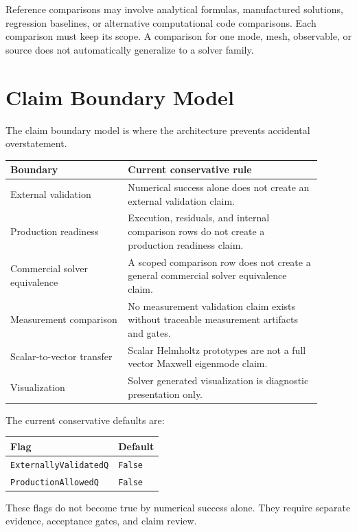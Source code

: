 \documentclass[11pt,a4paper]{article}
\newcommand{\code}[1]{\texttt{#1}}
\begin{document}
Reference comparisons may involve analytical formulas, manufactured solutions, regression baselines, or alternative computational code comparisons. Each comparison must keep its scope. A comparison for one mode, mesh, observable, or source does not automatically generalize to a solver family.

\section{Claim Boundary Model}
\label{sec:claim-boundary-model}

The claim boundary model is where the architecture prevents accidental overstatement.

\begin{longtable}{p{0.34\linewidth}p{0.56\linewidth}}
\toprule
\textbf{Boundary} & \textbf{Current conservative rule}\\
\midrule
\endhead
External validation & Numerical success alone does not create an external validation claim.\\
Production readiness & Execution, residuals, and internal comparison rows do not create a production readiness claim.\\
Commercial solver equivalence & A scoped comparison row does not create a general commercial solver equivalence claim.\\
Measurement comparison & No measurement validation claim exists without traceable measurement artifacts and gates.\\
Scalar-to-vector transfer & Scalar Helmholtz prototypes are not a full vector Maxwell eigenmode claim.\\
Visualization & Solver generated visualization is diagnostic presentation only.\\
\bottomrule
\end{longtable}

The current conservative defaults are:

\begin{center}
\begin{tabular}{ll}
\toprule
\textbf{Flag} & \textbf{Default}\\
\midrule
\code{ExternallyValidatedQ} & \code{False}\\
\code{ProductionAllowedQ} & \code{False}\\
\bottomrule
\end{tabular}
\end{center}

These flags do not become true by numerical success alone. They require separate evidence, acceptance gates, and claim review.
\end{document}
